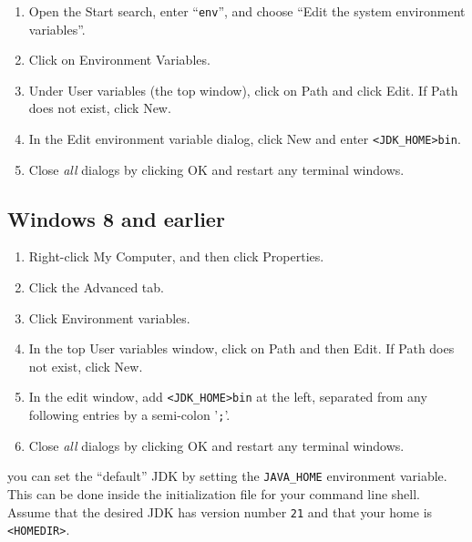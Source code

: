 \begin{enumerate}

\item Open the {\sf Start} search, enter ``{\tt env}'', and choose
{\sf ``Edit the system environment variables''}.

\item Click on {\sf Environment Variables}.

\item Under {\sf User variables} (the top window), click on {\sf Path}
and click {\sf Edit}. If {\sf Path} does not exist, click {\sf New}.

\item In the {\sf Edit environment variable} dialog, click {\sf New}
and enter {\tt<JDK\_HOME>\BKS bin}.

\item Close {\it all} dialogs by clicking {\sf OK} and restart 
any terminal windows.

\end{enumerate}

\subsection*{Windows 8 and earlier}

\begin{enumerate}

\item Right-click {\sf My Computer}, and then click {\sf Properties}.

\item Click the {\sf Advanced} tab.

\item Click {\sf Environment variables}.

\item In the top {\sf User variables} window, click on {\sf Path} and 
then {\sf Edit}. If {\sf Path} does not exist, click {\sf New}.

\item In the edit window, add {\tt<JDK\_HOME>\BKS bin} at the
left, separated from any following entries by a semi-colon '{\tt ;}'.

\item Close {\it all} dialogs by clicking {\sf OK} and restart 
any terminal windows.

\end{enumerate}
\fi
\ifMacOS
you can set the ``default'' JDK by setting the {\tt JAVA\_HOME}
environment variable.  This can be done inside the
initialization file for your command line shell.
Assume that the desired JDK has version number {\tt 21} and
that your home \directory{} is {\tt <HOMEDIR>}. 

